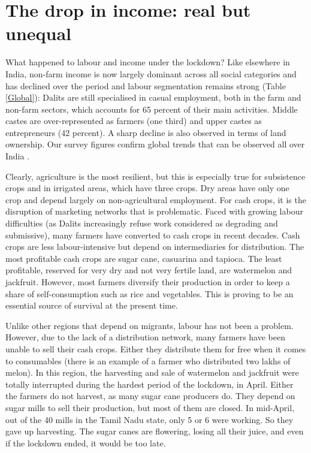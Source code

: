 \documentclass[a4paper, 11pt, onecolumn]{article}
\begin{document}
\section{The drop in income: real but unequal}
\label{section:income}

What happened to labour and income under the lockdown? Like elsewhere in India, non-farm income is now largely dominant across all social categories and has declined over the period and labour segmentation remains strong (Table \ref{Global}): Dalits are still specialised in casual  employment, both in the farm and non-farm sectors, which accounts for 65 percent of their main activities.
Middle castes are over-represented as farmers (one third) and upper castes as entrepreneurs (42 percent). 
A sharp decline is also observed in terms of land ownership. Our survey figures confirm global trends that can be observed all over India \citep{Lerche2009, Himanshu2011, Landy2018}. 



Clearly, agriculture is the most resilient, but this is especially true for subsistence crops and in irrigated areas, which have three crops.
Dry areas have only one crop and depend largely on non-agricultural employment. 
For cash crops, it is the disruption of marketing networks that is problematic. 
Faced with growing labour difficulties (as Dalits increasingly refuse work considered as degrading and submissive), many farmers have converted to cash crops in recent decades. 
Cash crops are less labour-intensive but depend on intermediaries for distribution. 
The most profitable cash crops are sugar cane, casuarina and tapioca. 
The least profitable, reserved for very dry and not very fertile land, are watermelon and jackfruit. 
However, most farmers diversify their production in order to keep a share of self-consumption such as rice and vegetables. 
This is proving to be an essential source of survival at the present time.

Unlike other regions that depend on migrants, labour has not been a problem. 
However, due to the lack of a distribution network, many farmers have been unable to sell their cash crops. 
Either they distribute them for free when it comes to consumables (there is an example of a farmer who distributed two lakhs of melon). 
In this region, the harvesting and sale of watermelon and jackfruit were totally interrupted during the hardest period of the lockdown, in April. 
Either the farmers do not harvest, as many sugar cane producers do. 
They depend on sugar mills to sell their production, but most of them are closed. 
In mid-April, out of the 40 mills in the Tamil Nadu state, only 5 or 6 were working. 
So they gave up harvesting. 
The sugar canes are flowering, losing all their juice, and even if the lockdown ended, it would be too late. 
\end{document}
